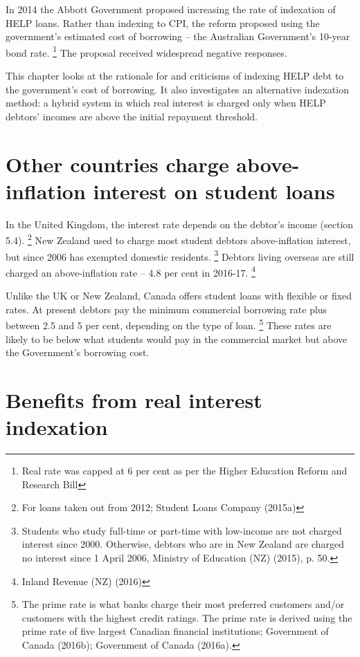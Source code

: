 \documentclass[embargoed]{grattan}
\begin{document}
In 2014 the Abbott Government proposed increasing the rate of indexation of \gls{HELP} loans.
Rather than indexing to \gls{CPI}, the reform proposed using the government's estimated cost of borrowing -- the Australian Government's 10-year bond rate.%
\footnote{Real rate was capped at 6 per cent as per the Higher Education Reform and Research Bill} The proposal received widespread negative responses.

This chapter looks at the rationale for and criticisms of indexing \gls{HELP} debt to the government's cost of borrowing.
It also investigates an alternative indexation method: a hybrid system in which real interest is charged only when \gls{HELP} debtors' incomes are above the initial repayment threshold.

\section{Other countries charge above-inflation interest on student loans}\label{other-countries-charge-above-inflation-interest-on-student-loans}

In the United Kingdom, the interest rate depends on the debtor's income (section 5.4).%
\footnote{For loans taken out from 2012; Student Loans Company (2015a)} New Zealand used to charge most student debtors above-inflation interest, but since 2006 has exempted domestic residents.%
\footnote{Students who study full-time or part-time with low-income are not charged interest since 2000.
Otherwise, debtors who are in New Zealand are charged no interest since 1 April 2006, Ministry of Education (NZ) (2015), p. 50.} Debtors living overseas are still charged an above-inflation rate -- 4.8 per cent in 2016-17.%
\footnote{Inland Revenue (NZ) (2016)}

Unlike the UK or New Zealand, Canada offers student loans with flexible or fixed rates.
At present debtors pay the minimum commercial borrowing rate plus between 2.5 and 5 per cent, depending on the type of loan.%
\footnote{The prime rate is what banks charge their most preferred customers and/or customers with the highest credit ratings.
The prime rate is derived using the prime rate of five largest Canadian financial institutions; Government of Canada (2016b); Government of Canada (2016a).} These rates are likely to be below what students would pay in the commercial market but above the Government's borrowing cost.

\section{Benefits from real interest indexation}\label{benefits-from-real-interest-indexation}
\end{document}
